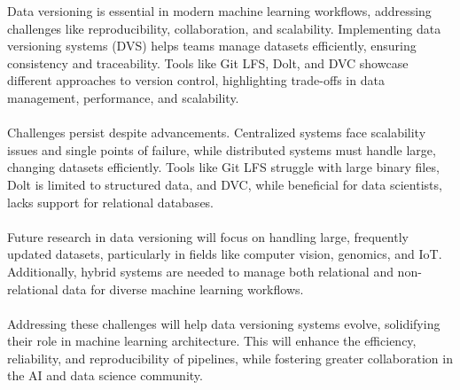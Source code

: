 Data versioning is essential in modern machine learning 
workflows, addressing challenges like reproducibility, 
collaboration, and scalability. Implementing data versioning 
systems (DVS) helps teams manage datasets efficiently, 
ensuring consistency and traceability. Tools like Git LFS, 
Dolt, and DVC showcase different approaches to version 
control, highlighting trade-offs in data management, 
performance, and scalability.
\\\\
Challenges persist despite advancements. Centralized systems 
face scalability issues and single points of failure, while 
distributed systems must handle large, changing datasets 
efficiently. Tools like Git LFS struggle with large binary 
files, Dolt is limited to structured data, and DVC, while 
beneficial for data scientists, lacks support for relational 
databases.
\\\\
Future research in data versioning will focus on handling 
large, frequently updated datasets, particularly in fields 
like computer vision, genomics, and IoT. Additionally, 
hybrid systems are needed to manage both relational and 
non-relational data for diverse machine learning workflows.
\\\\
Addressing these challenges will help data versioning systems 
evolve, solidifying their role in machine learning 
architecture. This will enhance the efficiency, reliability, 
and reproducibility of pipelines, while fostering greater 
collaboration in the AI and data science community.
